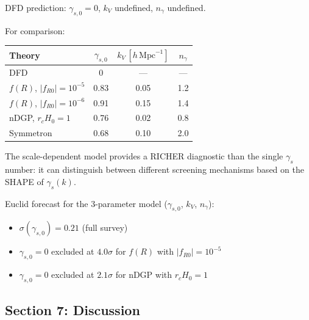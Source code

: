 \documentclass[11pt,a4paper]{article}
\begin{document}
DFD prediction: $\gamma_{s,0} = 0$, $k_V$ undefined, $n_\gamma$ undefined.

For comparison:
\begin{center}
\begin{tabular}{lccc}
\toprule
\textbf{Theory} & $\gamma_{s,0}$ & $k_V\,[h\,\mathrm{Mpc}^{-1}]$ & $n_\gamma$ \\
\midrule
DFD & 0 & --- & --- \\
$f(R)$, $|f_{R0}| = 10^{-5}$ & 0.83 & 0.05 & 1.2 \\
$f(R)$, $|f_{R0}| = 10^{-6}$ & 0.91 & 0.15 & 1.4 \\
nDGP, $r_c H_0 = 1$ & 0.76 & 0.02 & 0.8 \\
Symmetron & 0.68 & 0.10 & 2.0 \\
\bottomrule
\end{tabular}
\end{center}

The scale-dependent model provides a RICHER diagnostic than the single $\gamma_s$ number: it can distinguish between different screening mechanisms based on the SHAPE of $\gamma_s(k)$.

Euclid forecast for the 3-parameter model ($\gamma_{s,0}$, $k_V$, $n_\gamma$):
\begin{itemize}
\item $\sigma(\gamma_{s,0}) = 0.21$ (full survey)
\item $\gamma_{s,0} = 0$ excluded at $4.0\sigma$ for $f(R)$ with $|f_{R0}| = 10^{-5}$
\item $\gamma_{s,0} = 0$ excluded at $2.1\sigma$ for nDGP with $r_c H_0 = 1$
\end{itemize}

\subsection{Section 7: Discussion}
\end{document}
